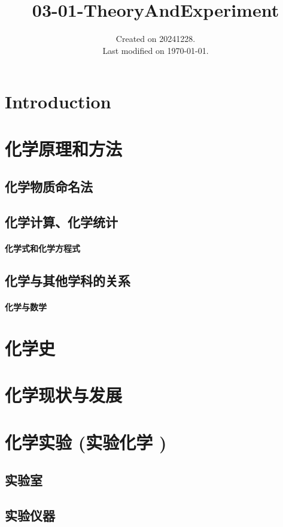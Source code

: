 \documentclass[UTF8]{../03-Chemistry}
\begin{document}
\title{03-01-TheoryAndExperiment}
\date{Created on 20241228.\\   Last modified on \today.}
\maketitle
\tableofcontents


\chapter{Introduction}


\chapter{化学原理和方法}
\section{化学物质命名法}
\section{化学计算、化学统计}
    \subsubsection{化学式和化学方程式}
\section{化学与其他学科的关系}
    \subsubsection{化学与数学}


\chapter{化学史}


\chapter{化学现状与发展}


\chapter{化学实验 (实验化学 )}
\section{实验室}
\section{实验仪器}
\end{document}
